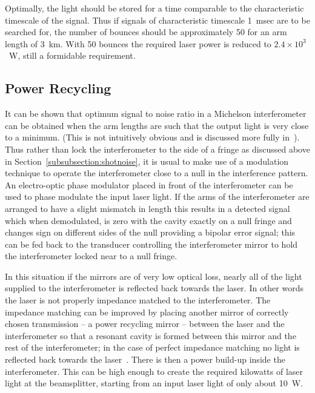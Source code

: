 \documentclass{article}
\begin{document}
Optimally, the light should be stored for a time comparable to the
characteristic timescale of the signal. Thus if signals of characteristic
timescale 1~msec are to be searched for, the number of bounces should be
approximately 50 for an arm length of 3~km. With 50 bounces the required laser
power is reduced to $2.4 \times 10^3$~W, still a formidable requirement.


\subsection{Power Recycling}
\label{subsection:powerrec}

It can be shown that optimum signal to noise ratio in a Michelson interferometer
can be obtained when the arm lengths are such that the output light is very
close to a minimum. (This is not intuitively obvious and is discussed more fully
in~\cite{Edelstein}). Thus rather than lock the interferometer to the side of a
fringe as discussed above in Section~\ref{subsubsection:shotnoise}, it is usual
to make use of a modulation technique to operate the interferometer close to a
null in the interference pattern. An electro-optic phase modulator placed in
front of the interferometer can be used to phase modulate the input laser light.
If the arms of the interferometer are arranged to have a slight mismatch in
length this results in a detected signal which when demodulated, is zero with
the cavity exactly on a null fringe and changes sign on different sides of the
null providing a bipolar error signal; this can be fed back to the transducer
controlling the interferometer mirror to hold the interferometer locked near to
a null fringe.

In this situation if the mirrors are of very low optical loss, nearly all of the
light supplied to the interferometer is reflected back towards the laser. In
other words the laser is not properly impedance matched to the interferometer.
The impedance matching can be improved by placing another mirror of correctly
chosen transmission -- a power recycling mirror -- between the laser and the
interferometer so that a resonant cavity is formed between this mirror and the
rest of the interferometer; in the case of perfect impedance matching no light
is reflected back towards the laser~\cite{Drever3, Schilling}. There is then a
power build-up inside the interferometer. This can be high enough to create the
required kilowatts of laser light at the beamsplitter, starting from an input
laser light of only about 10~W.
\end{document}
